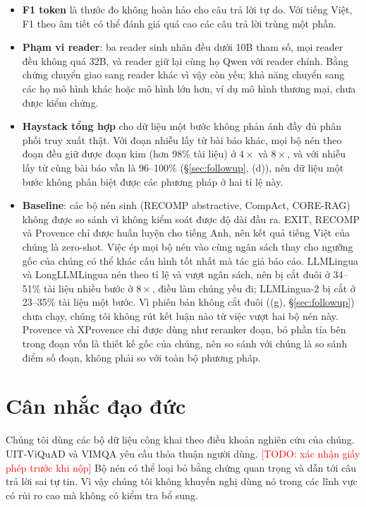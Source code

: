 \documentclass[11pt]{article}
\newcommand{\arm}[1]{\texttt{#1}}
\newcommand{\todo}[1]{\textcolor{red}{[TODO: #1]}}
\begin{document}
\begin{itemize}
  (Bảng~\ref{tab:cost}); Provence, XProvence, họ LLMLingua và \arm{ours\_sent} chỉ có thời gian đo trong stage chọn
  đoạn, nơi bốn tiến trình chạy song song và số đo cao hơn, kém ổn định hơn.
  \item \textbf{F1 token} là thước đo không hoàn hảo cho câu trả lời tự do. Với tiếng
  Việt, F1 theo âm tiết có thể đánh giá quá cao các câu trả lời trùng một phần.
  \item \textbf{Phạm vi reader}: ba reader sinh nhãn đều dưới 10B tham số, mọi reader đều không quá 32B, và reader giữ
  lại cùng họ Qwen với reader chính. Bằng chứng chuyển giao sang reader khác vì vậy còn yếu; khả năng chuyển sang các họ
  mô hình khác hoặc mô hình lớn hơn, ví dụ mô hình thương mại, chưa được kiểm chứng.
  \item \textbf{Haystack tổng hợp} cho dữ liệu một bước không phản ánh đầy đủ phân phối
  truy xuất thật. Với đoạn nhiễu lấy từ bài báo khác, mọi bộ nén theo đoạn đều giữ được đoạn kim (hơn 98\%
  tài liệu) ở $4\times$ và $8\times$, và với nhiễu lấy từ cùng bài báo vẫn là 96--100\% (\S\ref{sec:followup}, (d)),
  nên dữ liệu một bước không phân biệt được các phương pháp ở hai tỉ lệ này.
  \item \textbf{Baseline}: các bộ nén sinh (RECOMP abstractive, CompAct, CORE-RAG) không được
  so sánh vì không kiểm soát được độ dài đầu ra. EXIT, RECOMP và Provence chỉ được huấn luyện
  cho tiếng Anh, nên kết quả tiếng Việt của chúng là zero-shot. Việc ép mọi bộ nén vào cùng ngân
  sách thay cho ngưỡng gốc của chúng có thể khác cấu hình tốt nhất mà tác giả báo cáo. LLMLingua và LongLLMLingua
  nén theo tỉ lệ và vượt ngân sách, nên bị cắt đuôi ở 34--51\% tài liệu nhiều bước ở $8\times$, điều làm chúng
  yếu đi; LLMLingua-2 bị cắt ở 23--35\% tài liệu một bước. Vì phiên bản không cắt đuôi ((g), \S\ref{sec:followup})
  chưa chạy, chúng tôi không rút kết luận nào từ việc vượt hai bộ nén này. Provence và XProvence chỉ được dùng như
  reranker đoạn, bỏ phần tỉa bên trong đoạn vốn là thiết kế gốc của chúng, nên so sánh với chúng là so sánh điểm
  số đoạn, không phải so với toàn bộ phương pháp.
\end{itemize}

\section*{Cân nhắc đạo đức}
Chúng tôi dùng các bộ dữ liệu công khai theo điều khoản nghiên cứu của chúng. UIT-ViQuAD
và VIMQA yêu cầu thỏa thuận người dùng. \todo{xác nhận giấy phép trước khi nộp}
Bộ nén có thể loại bỏ bằng chứng quan trọng và dẫn tới câu trả lời sai tự tin. Vì vậy
chúng tôi không khuyến nghị dùng nó trong các lĩnh vực có rủi ro cao mà không có kiểm
tra bổ sung.
\end{document}
